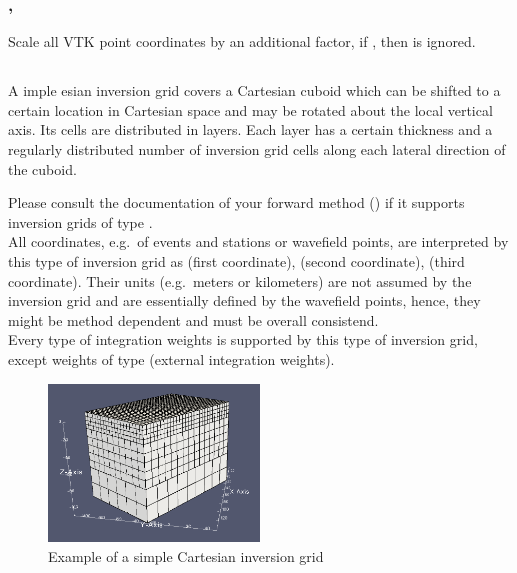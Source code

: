 \subsubsection{, }
Scale all VTK point coordinates by an additional factor,
if , then  is ignored.
%
\subsection{} \label{basic_steps,sec:invgrid,sub:scart}
%
A imple esian inversion grid covers a Cartesian cuboid which can
be shifted to a certain location in Cartesian space and may be rotated about the local vertical
axis. Its cells are distributed in layers. Each layer has a certain thickness and a regularly
distributed number of inversion grid cells along each lateral direction of the cuboid.

Please consult the documentation of your forward method () if it supports
inversion grids of type . \\
All coordinates, e.g.\ of events and stations or wavefield points, are interpreted by this type of inversion grid as
 (first coordinate),  (second coordinate),  (third coordinate). Their
units (e.g.\ meters or kilometers) are not assumed by the inversion grid and are essentially defined by the wavefield
points, hence, they might be method dependent and must be overall consistend.\\
Every type of integration weights is supported by this type of inversion grid, except weights of type 
 (external integration weights).

\begin{figure}[ht]
  \centering
  \includegraphics[width=0.5\textwidth]{images/scartInversionGrid_manual.png}
  \caption{Example of a simple Cartesian inversion grid}
  \label{basic_steps,sec:invgrid,sub:scart,fig:grid}
\end{figure}

